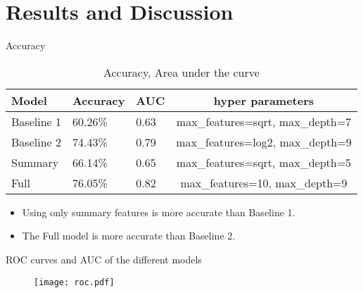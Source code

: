 \documentclass[t]{beamer}
\begin{document}
\section{Results and Discussion}

\begin{frame}{Accuracy}
\begin{table}
\begin{center}
 \begin{tabular}{| l | l | l | c |}
    \hline
    Model & Accuracy & AUC & hyper parameters\\
    \hline
    Baseline 1      & 60.26\% & 0.63 & \scriptsize{max\_features=sqrt, max\_depth=7} \\
    Baseline 2     & 74.43\% & 0.79 & \scriptsize{max\_features=log2, max\_depth=9}\\
    Summary        & 66.14\% & 0.65 & \scriptsize{max\_features=sqrt, max\_depth=5} \\
    Full           & 76.05\% & 0.82 &\scriptsize{ max\_features=10, max\_depth=9}\\
  \hline
\end{tabular}
\end{center}
\caption{Accuracy, Area under the curve }
\end{table}
\begin{itemize}
\item Using only summary features is more accurate than Baseline 1.
\item The Full model is more accurate than Baseline 2.
\end{itemize}

\end{frame}



\begin{frame}{ROC curves and AUC of the different models}
 \begin{figure}[ht!]
 \centering
 \texttt{[image: roc.pdf]}
 \end{figure}

\end{frame}
\end{document}
